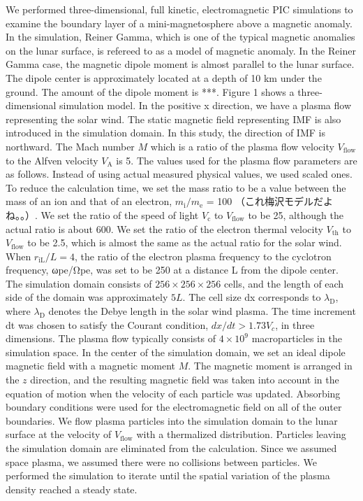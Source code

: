 \documentclass{EPS}
\begin{document}
We performed three-dimensional, full kinetic, electromagnetic PIC simulations to 
examine the boundary layer of a mini-magnetosphere above a magnetic anomaly. 
In the simulation, Reiner Gamma, which is one of the typical magnetic anomalies on the lunar surface, 
is refereed to as a model of magnetic anomaly. 
In the Reiner Gamma case, the magnetic dipole moment is almost parallel to the lunar surface. 
The dipole center is approximately located at a depth of 10 km under the ground. 
The amount of the dipole moment is ***.
Figure 1 shows a three-dimensional simulation model. In the positive x direction, 
we have a plasma flow representing the solar wind. 
The static magnetic field representing IMF is also introduced in the simulation domain. 
In this study, the direction of IMF is northward. 
The Mach number $M$ which is a ratio of the plasma flow velocity $V_\mathrm{flow}$ to the Alfven velocity $V_\mathrm{A}$ is 5. 
The values used for the plasma flow parameters are as follows. 
Instead of using actual measured physical values, we used scaled ones. 
To reduce the calculation time, we set the mass ratio to be a value between the mass of an ion and that of an electron, 
$ m_\mathrm{i}/ m_\mathrm{e}$ = 100 （これ梅沢モデルだよね。。）. 
We set the ratio of the speed of light $V_\mathrm{c}$ to $ V_\mathrm{flow}$ to be 25, although the actual ratio is about 600. 
We set the ratio of the electron thermal velocity $V_\mathrm{th}$ to $V_\mathrm{flow}$ to be 2.5, 
which is almost the same as the actual ratio for the solar wind. 
When $ r_\mathrm{iL} /L = 4$, the ratio of the electron plasma frequency to the cyclotron frequency, 
ωpe/Ωpe, was set to be 250 at a distance L from the dipole center. 
The simulation domain consists of $256 \times 256 \times 256$ cells, and the length of each side of 
the domain was approximately $5L$. 
The cell size dx corresponds to $\lambda_\mathrm{D}$, where $\lambda_\mathrm{D}$ 
denotes the Debye length in the solar wind plasma.
The time increment dt was chosen to satisfy the Courant condition, $dx/dt > 1.73 V_c $, in three dimensions. 
The plasma flow typically consists of $4 \times 10^9 $ macroparticles in the simulation space. 
In the center of the simulation domain, we set an ideal dipole magnetic field with a magnetic moment $M$. 
The magnetic moment is arranged in the $z$ direction, and the resulting magnetic field was taken into account in the equation of motion when the velocity of each particle was updated. 
Absorbing boundary conditions were used for the electromagnetic field on all of the outer boundaries. 
We flow plasma particles into the simulation domain to the lunar surface at the velocity of $V_\mathrm{flow}$
with a thermalized distribution. Particles leaving the simulation domain are eliminated from the calculation. 
Since we assumed space plasma, we assumed there were no collisions between particles. 
We performed the simulation to iterate until the spatial variation of the plasma density reached a steady state. 
\end{document}

